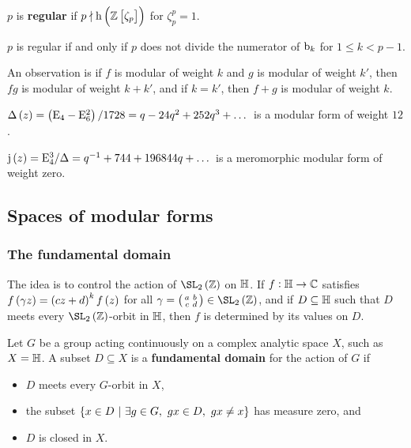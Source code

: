 $ p $ is \textbf{regular} if $ p \nmid \h\br{\ZZ\sbr{\zeta_p}} $ for $ \zeta_p^p = 1 $.

\begin{theorem}
$ p $ is regular if and only if $ p $ does not divide the numerator of $ \mathrm{b}_k $ for $ 1 \le k < p - 1 $.
\end{theorem}


An observation is if $ f $ is modular of weight $ k $ and $ g $ is modular of weight $ k' $, then $ fg $ is modular of weight $ k + k' $, and if $ k = k' $, then $ f + g $ is modular of weight $ k $.

\begin{example*}
$ \Delta\br{z} = \br{\E_4 - \E_6^2} / 1728 = q - 24q^2 + 252q^3 + \dots $ is a modular form of weight $ 12 $.
\end{example*}

\begin{example*}
$ \j\br{z} = \E_4^3 / \Delta = q^{-1} + 744 + 196844q + \dots $ is a meromorphic modular form of weight zero.
\end{example*}

\pagebreak

\subsection{Spaces of modular forms}

\subsubsection{The fundamental domain}

The idea is to control the action of $ \SL_2\br{\ZZ} $ on $ \mathbb{H} $. If $ f : \mathbb{H} \to \mathbb{C} $ satisfies $ f\br{\gamma z} = \br{cz + d}^kf\br{z} $ for all $ \gamma = \twobytwosmall{a}{b}{c}{d} \in \SL_2\br{\ZZ} $, and if $ D \subseteq \mathbb{H} $ such that $ D $ meets every $ \SL_2\br{\ZZ} $-orbit in $ \mathbb{H} $, then $ f $ is determined by its values on $ D $.

\begin{definition}
Let $ G $ be a group acting continuously on a complex analytic space $ X $, such as $ X = \mathbb{H} $. A subset $ D \subseteq X $ is a \textbf{fundamental domain} for the action of $ G $ if
\begin{itemize}
\item $ D $ meets every $ G $-orbit in $ X $,
\item the subset $ \cbr{x \in D \st \exists g \in G, \ gx \in D, \ gx \ne x} $ has measure zero, and
\item $ D $ is closed in $ X $.
\end{itemize}
\end{definition}

